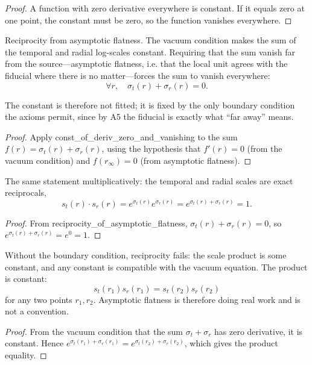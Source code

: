 \begin{proof}
A function with zero derivative everywhere is constant. If it equals zero at one point, the constant must be zero, so the function vanishes everywhere.
\end{proof}

\begin{theorem}
Reciprocity from asymptotic flatness. The vacuum condition makes the sum of the temporal and radial log-scales constant. Requiring that the sum vanish far from the source---asymptotic flatness, i.e. that the local unit agrees with the fiducial where there is no matter---forces the sum to vanish everywhere:
$$\forall r,\quad \sigma_t(r) + \sigma_r(r) = 0.$$

The constant is therefore not fitted; it is fixed by the only boundary condition the axioms permit, since by A5 the fiducial is exactly what ``far away'' means. 
\end{theorem}

\begin{proof}
Apply const\_of\_deriv\_zero\_and\_vanishing to the sum $f(r) = \sigma_t(r) + \sigma_r(r)$, using the hypothesis that $f'(r) = 0$ (from the vacuum condition) and $f(r_\infty) = 0$ (from asymptotic flatness).
\end{proof}

\begin{theorem}
The same statement multiplicatively: the temporal and radial scales are exact reciprocals,
$$s_t(r) \cdot s_r(r) = e^{\sigma_t(r)} e^{\sigma_r(r)} = e^{\sigma_t(r) + \sigma_r(r)} = 1.$$
\end{theorem}

\begin{proof}
From reciprocity\_of\_asymptotic\_flatness, $\sigma_t(r) + \sigma_r(r) = 0$, so $e^{\sigma_t(r) + \sigma_r(r)} = e^0 = 1$.
\end{proof}

\begin{theorem}
Without the boundary condition, reciprocity fails: the scale product is some constant, and any constant is compatible with the vacuum equation. The product is constant:
$$s_t(r_1) s_r(r_1) = s_t(r_2) s_r(r_2)$$
for any two points $r_1, r_2$. Asymptotic flatness is therefore doing real work and is not a convention. 
\end{theorem}

\begin{proof}
From the vacuum condition that the sum $\sigma_t + \sigma_r$ has zero derivative, it is constant. Hence $e^{\sigma_t(r_1) + \sigma_r(r_1)} = e^{\sigma_t(r_2) + \sigma_r(r_2)}$, which gives the product equality.
\end{proof}

